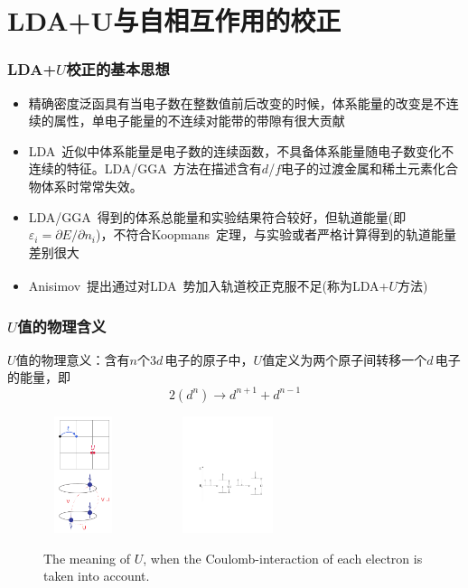 \documentclass[cjk,slidestop,compress,mathserif,blue]{beamer}
\newcommand{\upcite}[1]{\hspace{0ex}\textsuperscript{\cite{#1}}} %
\begin{document}
\section{LDA+U与自相互作用的校正}
\frame
{
\frametitle{LDA+$U$校正的基本思想}
\begin{itemize}
\setlength{\itemsep}{10pt}
	\item 精确密度泛函具有当电子数在整数值前后改变的时候，体系能量的改变是不连续的属性，单电子能量的不连续对能带的带隙有很大贡献
	 \item\textrm{LDA~}近似中体系能量是电子数的连续函数，不具备体系能量随电子数变化不连续的特征。\textrm{LDA/GGA~}方法在描述含有$d$/$f$电子的过渡金属和稀土元素化合物体系时常常失效。
	\item \textrm{LDA}/\textrm{GGA~}得到的体系总能量和实验结果符合较好，但轨道能量(即$\varepsilon_i=\partial E/\partial n_i$)，不符合\textrm{Koopmans~}定理，与实验或者严格计算得到的轨道能量差别很大%
	\item \textrm{Anisimov~}提出通过对\textrm{LDA~}势加入轨道校正克服不足(称为\textrm{LDA+$U$}方法)\upcite{PRB44-943_1991,PRB48-16929_1993}%
\end{itemize}
}
\frame
{
\frametitle{$U$值的物理含义}
\textrm{$U$}值的物理意义：含有$n$个3$d$\,电子的原子中，\textrm{$U$}值定义为两个原子间转移一个$d$\,电子的能量，即$$2(d^n)\rightarrow d^{n+1}+d^{n-1}$$
\begin{figure}[h!]
\centering
\includegraphics[height=1.35in,width=0.92in,viewport=1 1 240 375,clip]{Figures/LDA_U-1.png}
\includegraphics[height=1.35in,width=2.32in,viewport=110 210 545 455,clip]{Figures/LDA_U.pdf}
\caption{\small \textrm{The meaning of $U$, when the Coulomb-interaction of each electron is taken into account.}}%
\label{Tetrahedron_weight}
\end{figure}
}
\end{document}
